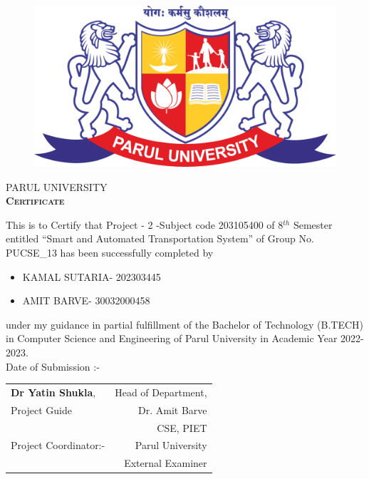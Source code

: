 \thispagestyle{plain}
\selectfont
\begin{figure}
    \centering
    \includegraphics[scale=0.1]{parullogo.png}
    \end{figure}
\vspace{1.5cm}
\begin{center}
    {\Huge \textsc{PARUL UNIVERSITY}}\\
   
    \vspace{1cm}
     {\Huge \bf \textsc{Certificate}}\\
     \vspace{0.5cm}
     \end{center}
     \large{This is to Certify that Project - 2 -Subject code 203105400 of 8$^{th}$ Semester entitled “Smart and Automated Transportation System” of Group No. PUCSE\_13 has been successfully completed by}
     \begin{itemize}
     \centering
         \item KAMAL SUTARIA- 202303445
         \item AMIT BARVE- 30032000458
     \end{itemize}
         
     \noindent
    \large {under my guidance in partial fulfillment of the Bachelor of Technology (B.TECH) in Computer Science and Engineering of Parul University in Academic Year 2022- 2023.}\\      
    Date of Submission :-
   
   \vspace{1.5cm}
   \begin{tabular}{l r}
   
      \textbf{Dr Yatin Shukla}, & \hspace{4cm} Head of Department,  \\ 
      Project Guide & Dr. Amit Barve \\  &  CSE, PIET\\
      Project Coordinator:-
      & Parul University\\ [7ex]  
      & External Examiner 
   \end{tabular}
   
   